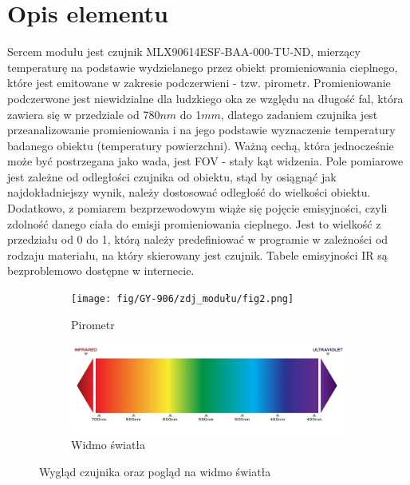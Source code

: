\documentclass[11pt, a4paper]{article}
\author{Dawid Wasung}
\institute{Instytut Robotyki i Inteligencji Maszynowej}
\begin{document}
\newpage

\section*{Opis elementu} 
Sercem modułu jest czujnik MLX90614ESF-BAA-000-TU-ND, mierzący temperaturę na podstawie wydzielanego przez obiekt promieniowania cieplnego, które jest emitowane w zakresie podczerwieni - tzw. pirometr. Promieniowanie podczerwone jest niewidzialne dla ludzkiego oka ze względu na długość fal, która zawiera się w przedziale od 780$ nm$ do 1$ mm$, dlatego zadaniem czujnika jest przeanalizowanie promieniowania i na jego podstawie wyznaczenie temperatury badanego obiektu (temperatury powierzchni). Ważną cechą, która jednocześnie może być postrzegana jako wada, jest FOV - stały kąt widzenia. Pole pomiarowe jest zależne od odległości czujnika od obiektu, stąd by osiągnąć jak najdokładniejszy wynik, należy dostosować odległość do wielkości obiektu. Dodatkowo, z pomiarem bezprzewodowym wiąże się pojęcie emisyjności, czyli zdolność danego ciała do emisji promieniowania cieplnego. Jest to wielkość z przedziału od 0 do 1, którą należy predefiniować w programie w zależności od rodzaju materiału, na który skierowany jest czujnik. Tabele emisyjności IR są bezproblemowo dostępne w internecie.
\vspace{0.5cm}
\begin{figure}[h!]
\centering
\begin{subfigure}{.5\textwidth}
  \centering
  \texttt{[image: fig/GY-906/zdj\_modułu/fig2.png]}
  \caption{Pirometr \cite{ArduinoModules:grab}}
  \label{fig:sub1}
\end{subfigure}%
\begin{subfigure}{.5\textwidth}
  \centering
  \includegraphics[width=1\linewidth]{fig/GY-906/zasada_dzialania/spektrum.png}
  \caption{Widmo światła \cite{bot:wykres}}
  \label{fig:sub2}
\end{subfigure}
\caption{Wygląd czujnika oraz pogląd na widmo światła}
\label{fig:test}
\end{figure}
\end{document}
